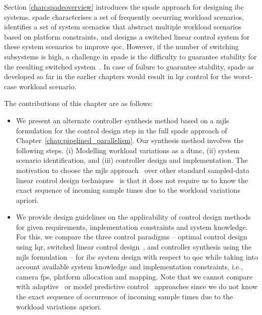  Section \ref{chap:spadeoverview} introduces the \gls{spade} approach for designing \gls{ibc} systems.  \gls{spade} characterises a set of frequently occurring workload scenarios, identifies a set of system scenarios that abstract multiple workload scenarios based on platform constraints, and designs a switched linear control system for these system scenarios to improve \gls{qoc}.   
 However, if the number of switching subsystems is high, a challenge in \gls{spade} is the difficulty to guarantee stability for the resulting switched system~\cite{mohamed2018optimising, van2018data}.
In case of failure to guarantee stability, \gls{spade} as developed so far in the earlier chapters would result in \gls{lqr} control for the worst-case workload scenario.

The contributions of this chapter are as follows:
 \begin{itemize}
     \item We present an alternate controller synthesis method based on a \gls{mjls} formulation for the control design step in the full \gls{spade} approach of Chapter~\ref{chap:pipelined_parallelism}. Our synthesis method involves the following steps. (i) Modelling workload variations as a \gls{dtmc}, (ii) system scenario identification, and (iii) controller design and implementation. The motivation to choose the \gls{mjls} approach~\cite{costa2006discrete} over other standard sampled-data linear control design techniques~\cite{ogata1995discrete} is that it does not require us to know the exact sequence of incoming sample times due to the workload variations apriori.
     \item We provide design guidelines on the applicability of control design methods for given requirements, implementation constraints and system knowledge. For this, we compare the three control paradigms -- optimal control design using \gls{lqr}, switched linear control design~\cite{van2018data}, and controller synthesis using the \gls{mjls} formulation
     -- for \gls{ibc} system design with respect to \gls{qoc} while taking into account available system knowledge and implementation constraints, i.e., camera fps, platform allocation and mapping. 
     Note that we cannot compare with adaptive~\cite{goodwin1980discrete} or model predictive control~\cite{bemporad2002model} approaches since we do not know the exact sequence of occurrence of incoming sample times due to the workload variations apriori.
 \end{itemize}